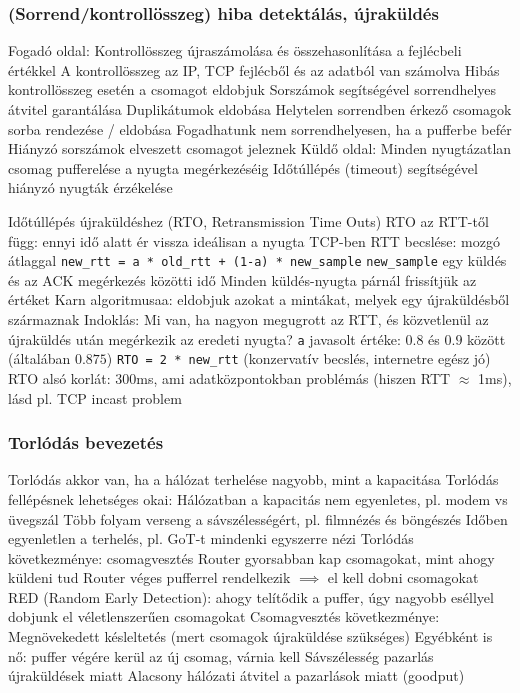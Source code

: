 \documentclass[12pt,a4paper]{article}
\begin{document}
\subsubsection{(Sorrend/kontrollösszeg) hiba detektálás, újraküldés}

\begin{outline}
	\1 Fogadó oldal:
		\2 Kontrollösszeg újraszámolása és összehasonlítása a fejlécbeli értékkel
			\3 A kontrollösszeg az IP, TCP fejlécből és az adatból van számolva
			\3 Hibás kontrollösszeg esetén a csomagot eldobjuk
		\2 Sorszámok segítségével sorrendhelyes átvitel garantálása
			\3 Duplikátumok eldobása
			\3 Helytelen sorrendben érkező csomagok sorba rendezése / eldobása
				\4 Fogadhatunk nem sorrendhelyesen, ha a pufferbe befér
			\3 Hiányzó sorszámok elveszett csomagot jeleznek
	\1 Küldő oldal:
		\2 Minden nyugtázatlan csomag pufferelése a nyugta megérkezéséig
		\2 Időtúllépés (timeout) segítségével hiányzó nyugták érzékelése
\end{outline}

\pagebreak

\begin{outline}
	\1 Időtúllépés újraküldéshez (RTO, Retransmission Time Outs)
		\2 RTO az RTT-től függ: ennyi idő alatt ér vissza ideálisan a nyugta
		\2 TCP-ben RTT becslése: mozgó átlaggal
			\3 \texttt{new\_rtt = a * old\_rtt + (1-a) * new\_sample}
			\3 \texttt{new\_sample} egy küldés és az ACK megérkezés közötti idő
			\3 Minden küldés-nyugta párnál frissítjük az értéket
				\4 Karn algoritmusaa: eldobjuk azokat a mintákat, melyek egy újraküldésből származnak
				\4 Indoklás: Mi van, ha nagyon megugrott az RTT, és közvetlenül az újraküldés után megérkezik az eredeti nyugta?
			\3 \texttt{a} javasolt értéke: $0.8$ és $0.9$ között (általában $0.875$)
		\2 \texttt{RTO = 2 * new\_rtt} (konzervatív becslés, internetre egész jó)
			\3 RTO alsó korlát: 300ms, ami adatközpontokban problémás (hiszen RTT $\approx$ 1ms), lásd pl. TCP incast problem
\end{outline}

\subsubsection{Torlódás bevezetés}

\begin{outline}
	\1 Torlódás akkor van, ha a hálózat terhelése nagyobb, mint a kapacitása
	\1 Torlódás fellépésnek lehetséges okai:
		\2 Hálózatban a kapacitás nem egyenletes, pl. modem vs üvegszál
		\2 Több folyam verseng a sávszélességért, pl. filmnézés és böngészés
		\2 Időben egyenletlen a terhelés, pl. GoT-t mindenki egyszerre nézi
	\1 Torlódás következménye: csomagvesztés
		\2 Router gyorsabban kap csomagokat, mint ahogy küldeni tud
		\2 Router véges pufferrel rendelkezik $\implies$ el kell dobni csomagokat
		\2 RED (Random Early Detection): ahogy telítődik a puffer, úgy nagyobb eséllyel dobjunk el véletlenszerűen csomagokat
	\1 Csomagvesztés következménye:
		\2 Megnövekedett késleltetés (mert csomagok újraküldése szükséges)
			\3 Egyébként is nő: puffer végére kerül az új csomag, várnia kell
		\2 Sávszélesség pazarlás újraküldések miatt
		\2 Alacsony hálózati átvitel a pazarlások miatt (goodput)
\end{outline}
\end{document}
